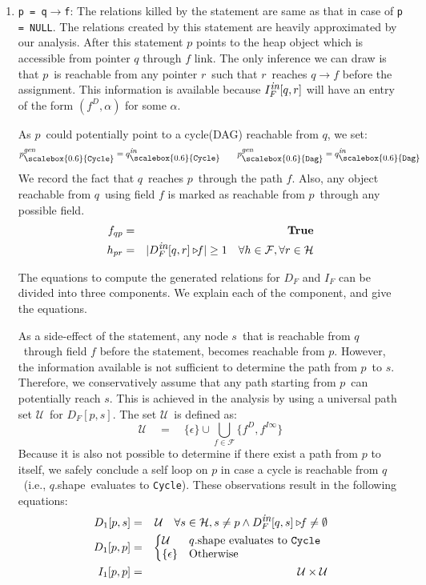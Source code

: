 \documentclass[letterpaper]{sig-alternate}
\newcommand{\p}{\ensuremath{p}}
\newcommand{\q}{\ensuremath{q}}
\newcommand{\s}{\ensuremath{s}}
\newcommand{\myr}{\ensuremath{r}}
\newcommand{\drct}{\ensuremath{D}}
\newcommand{\indrct}{\ensuremath{I}}
\newcommand{\heap}{\ensuremath{\mathcal{H}}}
\newcommand{\fields}{\ensuremath{\mathcal{F}}}
\newcommand{\upath}{\ensuremath{\mathcal{U}}}
\newcommand{\shape}{\mbox{shape}}
\newcommand{\subC}{\mbox{\scalebox{0.6}{\Cycle}}}
\newcommand{\subD}{\mbox{\scalebox{0.6}{\Dag}}}
\newcommand{\epsilonset}{\ensuremath{\{\epsilon\}}}
\newcommand{\din}{\mbox{\footnotesize\em in}}
\newcommand{\dgen}{\mbox{\footnotesize\em gen}}
\newcommand{\GenC}[1]{\ensuremath{{#1}_{\subC}^{\dgen}}}
\newcommand{\GenD}[1]{\ensuremath{{#1}_{\subD}^{\dgen}}}
\newcommand{\InC}[1]{\ensuremath{{#1}_{\subC}^{\din}}}
\newcommand{\InD}[1]{\ensuremath{{#1}_{\subD}^{\din}}}
\newcommand{\project}[2]{\ensuremath{#1\triangleright\!\!#2}}
\newcommand{\num}[1]{\ensuremath{|#1|}}
\newcommand{\Dag}{{\tt Dag}}
\newcommand{\Cycle}{{\tt Cycle}}
\newcommand{\true}{\textbf{True}}
\begin{document}
\begin{enumerate}
\item {\tt p = q$\rightarrow$f}: The relations killed by the
  statement are same as that in case of {\tt p = NULL}. The
  relations created by this statement are heavily
  approximated by our analysis. After this statement $\p$
  points to the heap object which is accessible from pointer
  $\q$ through $f$ link. The only inference we can draw is
  that \p\ is reachable from any pointer \myr\ such that
  \myr\ reaches $\q\rightarrow f$ before the assignment. This
  information is available because $I_F^{\din}[\q, \myr]$
  will have an entry of the form $(f^\drct, \alpha)$ for some
  $\alpha$. 

  As \p\ could potentially point to a cycle(DAG) reachable
  from \q, we set:
  $$\GenC{p} = \InC{q} \qquad \GenD{p} = \InD{q}$$ We record
  the fact that \q\ reaches \p\ through the path
  $f$. Also, any object reachable from \q\ using field $f$
  is marked as reachable from \p\ through any
  possible field.
\begin{eqnarray*}
  f_{\q\p} &=& \true \\ %
  {h_{\p\myr}} &=&
  \num{\project{D_F^{\din}[\q,\myr]}{f}} \geq 1\quad
  \forall h \in \fields, \forall \myr \in \heap 
\end{eqnarray*}

The equations to compute the generated relations for  $D_F$ and $I_F$
can be divided into three components. We explain each of the
component, and give the equations.

As a side-effect of the statement, any node \s\ that is
reachable from \q\ through field $f$ before the statement,
becomes reachable from \p. However, the information available
is not sufficient to determine the path from \p\ to
\s. Therefore, we conservatively assume that any path
starting from \p\ can potentially reach \s. This is achieved
in the analysis by using a universal path set \upath\ for
$D_F[\p,\s]$. The set \upath\ is defined as:
\[ \upath \quad=\quad \epsilonset \cup \bigcup_{f\in\fields} \{f^{\drct},
f^{\indrct\infty}\} \] Because it is also not possible to determine
if there exist a path from $\p$ to itself,  we safely
conclude a self loop on $p$ in case a cycle is reachable
from \q\ (i.e., \q.\shape\ evaluates to \Cycle). 
These
observations result in the following equations:
\begin{eqnarray*}
  D_1[\p, \s] &=&  \upath \quad
  \forall \s \in \heap, \s \not=\p \wedge
  \project{D_F^{\din}[\q, \s]}{f} \not= \emptyset
  \\
  D_1[\p, \p] &=& \left\{\begin{array}{@{}ll}
    \upath& \q.\shape \mbox{ evaluates to } \Cycle \\
    \epsilonset & \mbox{Otherwise}
  \end{array}\right.  \\
  I_1[\p, \p] &=& \upath \times \upath  
\end{eqnarray*}


\end{enumerate}
\end{document}
